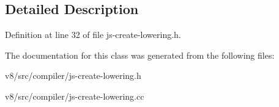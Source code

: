 \subsection{Detailed Description}


Definition at line 32 of file js-\/create-\/lowering.\+h.



The documentation for this class was generated from the following files\+:\begin{DoxyCompactItemize}
\item 
v8/src/compiler/js-\/create-\/lowering.\+h\item 
v8/src/compiler/js-\/create-\/lowering.\+cc\end{DoxyCompactItemize}
